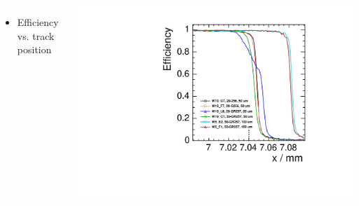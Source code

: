 \begin{frame}
\begin{columns}
\begin{columns}
    \end{columns}

  \end{columns}

  \begin{columns}[t]
    
    \begin{itemize}
    \item Efficiency vs. track position
    \end{itemize}
    \centering
    \includegraphics[width=\textwidth, page=6]{../figures/TestBeam/edge_bcp.pdf}
    

\end{columns}
\end{frame}

